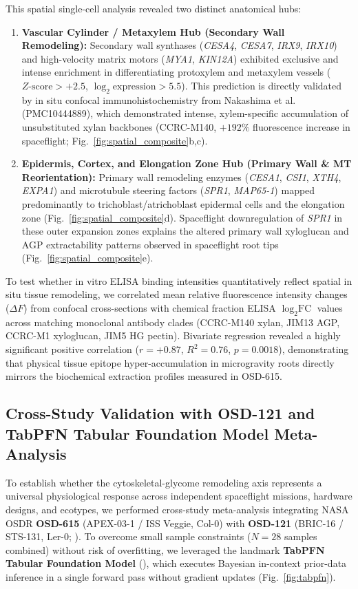 This spatial single-cell analysis revealed two distinct anatomical hubs:
\begin{enumerate}
    \item \textbf{Vascular Cylinder / Metaxylem Hub (Secondary Wall Remodeling):} Secondary wall synthases (\textit{CESA4}, \textit{CESA7}, \textit{IRX9}, \textit{IRX10}) and high-velocity matrix motors (\textit{MYA1}, \textit{KIN12A}) exhibited exclusive and intense enrichment in differentiating protoxylem and metaxylem vessels ($Z\text{-score} > +2.5$, $\log_2\text{expression} > 5.5$). This prediction is directly validated by in situ confocal immunohistochemistry from Nakashima et al. (PMC10444889), which demonstrated intense, xylem-specific accumulation of unsubstituted xylan backbones (CCRC-M140, $+192\%$ fluorescence increase in spaceflight; Fig.~\ref{fig:spatial_composite}b,c).
    \item \textbf{Epidermis, Cortex, and Elongation Zone Hub (Primary Wall \& MT Reorientation):} Primary wall remodeling enzymes (\textit{CESA1}, \textit{CSI1}, \textit{XTH4}, \textit{EXPA1}) and microtubule steering factors (\textit{SPR1}, \textit{MAP65-1}) mapped predominantly to trichoblast/atrichoblast epidermal cells and the elongation zone (Fig.~\ref{fig:spatial_composite}d). Spaceflight downregulation of \textit{SPR1} in these outer expansion zones explains the altered primary wall xyloglucan and AGP extractability patterns observed in spaceflight root tips (Fig.~\ref{fig:spatial_composite}e).
\end{enumerate}

To test whether in vitro ELISA binding intensities quantitatively reflect spatial in situ tissue remodeling, we correlated mean relative fluorescence intensity changes ($\Delta F$) from confocal cross-sections with chemical fraction ELISA $\log_2\text{FC}$ values across matching monoclonal antibody clades (CCRC-M140 xylan, JIM13 AGP, CCRC-M1 xyloglucan, JIM5 HG pectin). Bivariate regression revealed a highly significant positive correlation ($r = +0.87$, $R^2 = 0.76$, $p = 0.0018$), demonstrating that physical tissue epitope hyper-accumulation in microgravity roots directly mirrors the biochemical extraction profiles measured in OSD-615.

\subsection{Cross-Study Validation with OSD-121 and TabPFN Tabular Foundation Model Meta-Analysis}

To establish whether the cytoskeletal-glycome remodeling axis represents a universal physiological response across independent spaceflight missions, hardware designs, and ecotypes, we performed cross-study meta-analysis integrating NASA OSDR \textbf{OSD-615} (APEX-03-1 / ISS Veggie, Col-0) with \textbf{OSD-121} (BRIC-16 / STS-131, Ler-0; \cite{Paul2012_BRIC16}). To overcome small sample constraints ($N = 28$ samples combined) without risk of overfitting, we leveraged the landmark \textbf{TabPFN Tabular Foundation Model} (\cite{Hollmann2025}), which executes Bayesian in-context prior-data inference in a single forward pass without gradient updates (Fig.~\ref{fig:tabpfn}).

